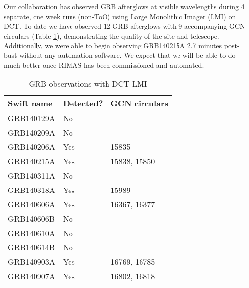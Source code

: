 \documentclass[letterpaper,11pt]{article}
\begin{document}
	\pagestyle{plain}

	Our collaboration has observed GRB afterglows at visible wavelengths during 4 separate, one week runs (non-ToO) using Large Monolithic Imager (LMI) on DCT. To date we have observed 12 GRB afterglows with 9 accompanying GCN circulars (Table \ref{table:DCTobs}), demonstrating the quality of the site and telescope. Additionally, we were able to begin observing GRB140215A 2.7 minutes post-bust without any automation software.  We expect that we will be able to do much better once RIMAS has been commissioned and automated. \\

	\begin{table}[ht]
		\centering 
		\begin{tabular}{lll}
			\hline\hline
			\textbf{Swift name} & \textbf{Detected?} & \textbf{GCN circulars}		\\
			\hline
			GRB140129A			& No					&							\\
			GRB140209A			& No					&							\\
			GRB140206A			& Yes					& 15835						\\
			GRB140215A			& Yes					& 15838, 15850				\\
			GRB140311A			& No					&							\\
			GRB140318A			& Yes					& 15989						\\
			GRB140606A			& Yes					& 16367, 16377				\\
			GRB140606B			& No					&							\\
			GRB140610A			& No					&							\\
			GRB140614B			& No					&							\\
			GRB140903A			& Yes					& 16769, 16785				\\
			GRB140907A			& Yes					& 16802, 16818				\\
			\hline
		\end{tabular}
		\caption{GRB observations with DCT-LMI}
		\label{table:DCTobs} 
	\end{table}
\end{document}
